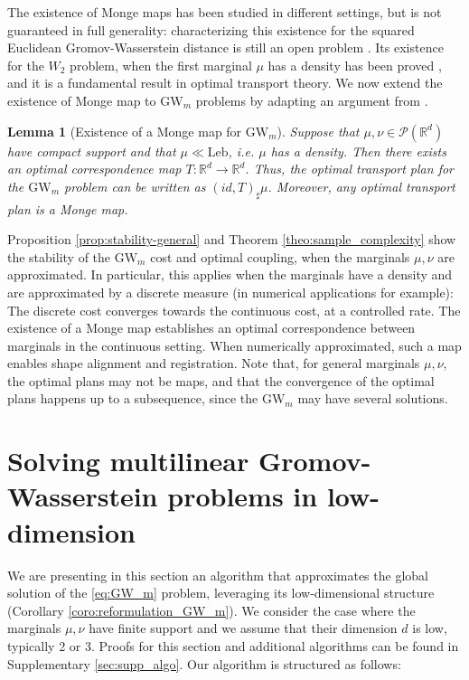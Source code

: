 \documentclass{article}
\newcommand{\R}{\mathbb{R}}
\newcommand{\1}{\mathbf{1}}
\newcommand{\GW}{\mathrm{GW}}
\newcommand{\Leb}{\mathrm{Leb}}
\renewcommand{\P}{\mathcal{P}}
\newtheorem{lemma}{Lemma}
\theoremstyle{definition}
\theoremstyle{remark}
\begin{document}
The existence of Monge maps has been studied in different settings, but is not guaranteed in full generality: characterizing this existence for the squared Euclidean Gromov-Wasserstein distance is still an open problem \cite{dumont2025existence}. Its existence for the $W_2$ problem, when the first marginal $\mu$ has a density has been proved \cite{brenier1987decomposition}, and it is a fundamental result in optimal transport theory. 
We now extend the existence of Monge map to $\GW_m$ problems by adapting an argument from \cite[Theorem 3.2]{dumont2025existence}.
\begin{lemma}[Existence of a Monge map for $\GW_m$] \label{lem:Monge_DGW}
    Suppose that $\mu,\nu \in \P(\R^d)$ have compact support and that $\mu\ll \Leb$, i.e. $\mu$ has a density. Then there exists an optimal correspondence map $T:\R^d\to\R^d$. Thus, the optimal transport plan for the $\GW_{m}$ problem can be written as $(id,T)_\sharp\mu$. Moreover, any optimal transport plan is a Monge map.
\end{lemma}
Proposition \ref{prop:stability-general} and Theorem \ref{theo:sample_complexity} show the stability of the $\GW_m$ cost and optimal coupling, when the marginals $\mu,\nu$ are approximated. In particular, this applies when the marginals have a density and  are approximated by a discrete measure (in numerical applications for example): The discrete cost converges towards the continuous cost, at a controlled rate. The existence of a Monge map establishes an optimal correspondence between marginals in the continuous setting. When numerically approximated, such a map enables shape alignment and registration. Note that, for general marginals  $\mu,\nu$, the optimal plans may not be maps, and that the convergence of the optimal plans happens up to a subsequence, since the $\GW_m$ may have several solutions.

\section{Solving multilinear Gromov-Wasserstein problems in low-dimension}\label{sec:algo}
We are presenting in this section an algorithm that approximates the global solution of the \ref{eq:GW_m} problem, leveraging its low-dimensional structure (Corollary \ref{coro:reformulation_GW_m}).  We consider the case where the marginals $\mu,\nu$ have finite support and we assume that their dimension $d$ is low, typically 2 or 3.   Proofs for this section and additional algorithms can be found in Supplementary \ref{sec:supp_algo}. Our algorithm is structured as follows: 
\end{document}
